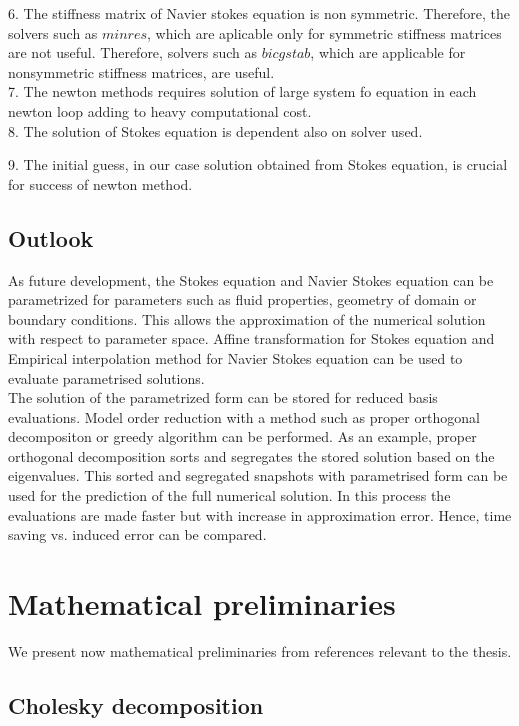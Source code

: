 \documentclass[a4paper]{book}
\begin{document}
6. The stiffness matrix of Navier stokes equation is non symmetric. Therefore, the solvers such as $minres$, which are aplicable only for symmetric stiffness matrices are not useful. Therefore, solvers such as $bicgstab$, which are applicable for nonsymmetric stiffness matrices, are useful.\\

7. The newton methods requires solution of large system fo equation in each newton loop adding to heavy computational cost.\\

8. The solution of Stokes equation is dependent also on solver used.

9. The initial guess, in our case solution obtained from Stokes equation, is crucial for success of newton method.\\

\section{Outlook}

As future development, the Stokes equation and Navier Stokes equation can be parametrized for parameters such as fluid properties, geometry of domain or boundary conditions. This allows the approximation of the numerical solution with respect to parameter space. Affine transformation for Stokes equation and Empirical interpolation method for Navier Stokes equation can be used to evaluate parametrised solutions. \\

The solution of the parametrized form can be stored for reduced basis evaluations. Model order reduction with a method such as proper orthogonal decompositon or greedy algorithm can be performed. As an example, proper orthogonal decomposition sorts and segregates the stored solution based on the eigenvalues. This sorted and segregated snapshots with parametrised form can be used for the prediction of the full numerical solution. In this process the evaluations are made faster but with increase in approximation error. Hence, time saving vs. induced error can be compared.

\chapter{Mathematical preliminaries}

We present now mathematical preliminaries from references relevant to the thesis. 

\section{Cholesky decomposition} \label{chol}
\end{document}
